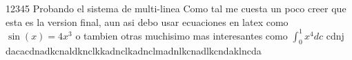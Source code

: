 12345 Probando el sistema de multi-linea
Como tal me cuesta un poco creer que esta es
la version final, aun asi debo usar ecuaciones
en latex como $\sin(x) = 4x^3$ o tambien otras 
muchisimo mas interesantes como $\int_0^1 x^4 dc$ cdnj 
dacacdnadkcnaldknclkkadnclkadnclmadnlkcnadlkcndaklncda
